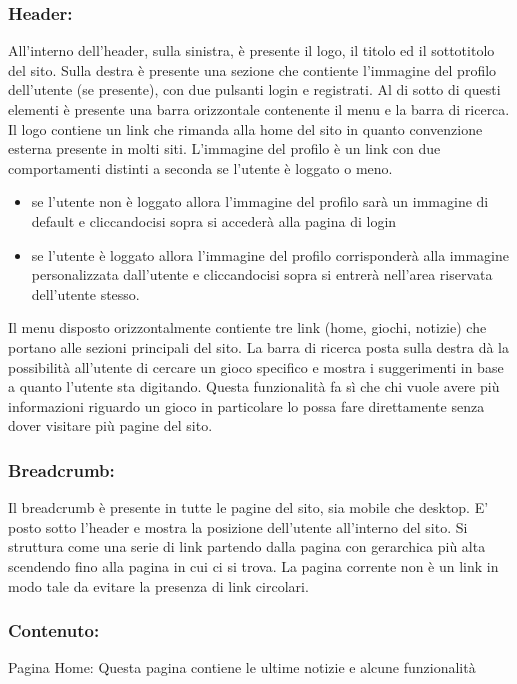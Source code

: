 \subsubsection{Header:}
All'interno dell'header, sulla sinistra, è presente il logo, il titolo ed il sottotitolo del sito. Sulla destra è presente una sezione che contiente l'immagine del profilo dell'utente (se presente), con due pulsanti login e registrati. Al di sotto di questi elementi è presente una barra orizzontale contenente il menu e la barra di ricerca.
Il logo contiene un link che rimanda alla home del sito in quanto convenzione esterna presente in molti siti.
L'immagine del profilo è un link con due comportamenti distinti a seconda se l'utente è loggato o meno.
\begin{itemize}
	\item se l'utente non è loggato allora l'immagine del profilo sarà un immagine di default e cliccandocisi sopra si accederà alla pagina di login
	\item se l'utente è loggato allora l'immagine del profilo corrisponderà alla immagine personalizzata dall'utente e cliccandocisi sopra si entrerà nell'area riservata dell'utente stesso.   
\end{itemize}


Il menu disposto orizzontalmente contiente tre link (home, giochi, notizie) che portano alle sezioni principali del sito.
La barra di ricerca posta sulla destra dà la possibilità all'utente di cercare un gioco specifico e mostra i suggerimenti in base a quanto l'utente sta digitando. Questa funzionalità fa sì che chi vuole avere più informazioni riguardo un gioco in particolare lo possa fare direttamente senza dover visitare più pagine del sito.

\subsubsection{Breadcrumb:}
Il breadcrumb è presente in tutte le pagine del sito, sia mobile che desktop.
E' posto sotto l'header e mostra la posizione dell'utente all'interno del sito. Si struttura come una serie di link partendo dalla pagina con gerarchica più alta scendendo fino alla pagina in cui ci si trova. La pagina corrente non è un link in modo tale da evitare la presenza di link circolari.

\subsubsection{Contenuto:}
Pagina Home: Questa pagina contiene le ultime notizie e alcune funzionalità
